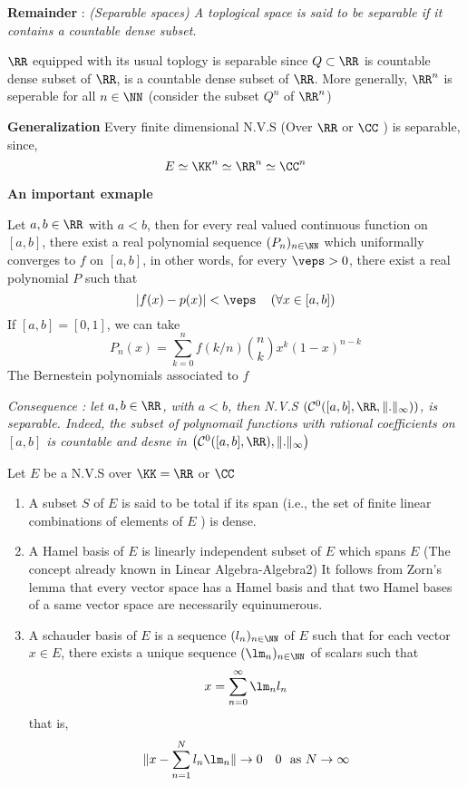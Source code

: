 \lecday[2025-04-15]

% 

\divider
\textbf{Remainder} : \it(Separable spaces)\normalfont
A toplogical space is said to be separable if it 
contains a countable dense subset.
\divider
\begin{example}
$\RR$  equipped with its usual toplogy is separable
since $Q \subset \RR  $ is countable dense subset of
$\RR$, is a countable dense subset of 
$\RR$. More generally, $\RR ^n  $  
is seperable for all $n \in  \NN $  
(consider the subset $Q^{n} $ of $\RR ^n  $)
\end{example}
\divider
\textbf{
Generalization
}
Every finite dimensional N.V.S (Over $\RR$ or $\CC$  ) 
is separable, since, 
\[
E  \simeq  \KK^n  \simeq  \RR ^n  \simeq  \CC ^n 
\]
\divider
\begin{center}
	\textbf{An important exmaple}
\end{center}
\begin{theorem}
	Let $a,b \in \RR  $  with $a < b $, 
	then for every real valued continuous function on 
	$[a,b]  $, 
	there exist a real polynomial sequence $(P_{n}) _{n \in \NN} $  
	which uniformally converges to $f $ on $[a,b]$, in other 
	words, for every $ \veps  > 0 $, there exist a real polynomial
	 $P $ such that 
	 \[
	  \left| f(x) - p(x)  \right| <  \veps  
	  \quad  \left(  \forall  x \in  [a,b]  \right) 
	 \]
	 If $[a,b] = [0,1]$, we can take 
	 \[
	 P_{n}(x)  = 
	 \sum_{k = 0 }^{n}  
	 f(k/n) \binom{n}{k} x^{k}(1-x) ^{n-k}  
	 \]
	 The Bernestein polynomials associated to $f$ 
\end{theorem}
\it Consequence : \normalfont 
let $a,b \in  \RR  $, with $a < b$,
then N.V.S $(\mathcal{C} ^{0}([a,b], \RR , \| . \| _{\infty }))  $, 
is separable. Indeed, the subset of polynomail functions
with rational coefficients on $[a,b]  $ is countable and 
desne in $\left( \mathcal{C} ^{0}([a,b], \RR ), 
\| . \|_{\infty } \right) $  
\begin{definition}[]
Let $E $  be a N.V.S over $\KK=\RR  $  or $\CC $ 
\begin{enumerate}
\item A subset $S $ of $E $ is said to be total if 
	its span (i.e., the set of finite linear 
	combinations of elements of $E $ ) is dense.
\item A Hamel basis of $E $ is linearly independent 
	subset of $E $ which spans $E $ 
	(The concept already known in Linear Algebra-Algebra2)
It follows from Zorn's lemma that every vector space has 
a Hamel basis and that two Hamel bases of a same vector space
are necessarily equinumerous.
\item A schauder basis of $E $ is a sequence 
	$(l_{n}) _{n \in \NN} $  of $E $ such that 
	for each vector $x \in E $, there exists 
	a unique sequence $(\lm_{n}) _{n \in \NN} $  
	of scalars such that 
	\[
	x = \sum_{n=0}^{\infty}  \lm_{n} l_{n}
	\]
	that is, 
	\[
	\| x- \sum_{n=1}^{N} l_{n} \lm_{n} \| \rightarrow 0 
	\quad 0 \text{ as } N \rightarrow  \infty 
	\]
\end{enumerate}
\end{definition}
